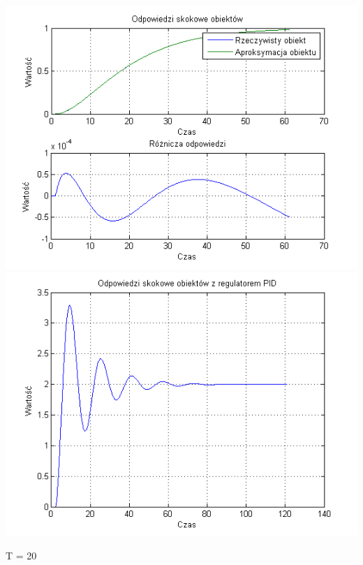 \documentclass[10pt,a4paper]{article}
\begin{document}
\begin{center}
\includegraphics[scale=1]{images/dwa/skrypt_73.png}\\
\includegraphics[scale=1]{images/dwa/skrypt_74.png}\\
\end{center}
\newpage
T = 20
\end{document}
